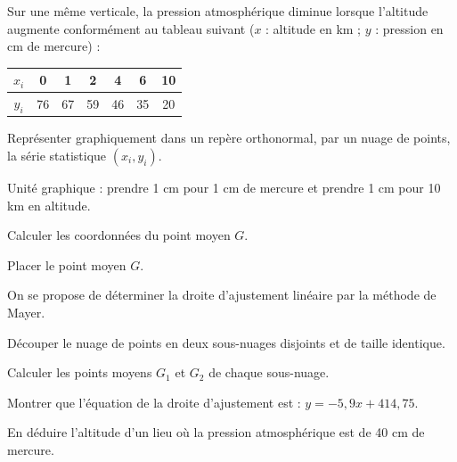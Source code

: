 \documentclass[11pt]{article}
\begin{document}
Sur une même verticale, la pression atmosphérique diminue lorsque l'altitude augmente conformément au tableau suivant ($x$ : altitude en km ; $y$ : pression en cm de mercure) :
\begin{center}\renewcommand{\arraystretch}{1.4}
\begin{tabular}{|c|c|c|c|c|c|c|}
\hline
$x_i$ & 0 & 1 & 2 & 4 & 6 & 10 \\
\hline
$y_i$ & 76 & 67 & 59 & 46 & 35 & 20 \\
\hline
\end{tabular}
\end{center}
\begin{questions}
  \item Représenter graphiquement dans un repère orthonormal, par un nuage de points, la série statistique $(x_i, y_i)$.

  Unité graphique : prendre 1 cm pour 1 cm de mercure et prendre 1 cm pour 10 km en altitude.
  \item Calculer les coordonnées du point moyen $G$.
  \item Placer le point moyen $G$.
  \item On se propose de déterminer la droite d'ajustement linéaire par la méthode de Mayer.
  \begin{sousq}
    \item Découper le nuage de points en deux sous-nuages disjoints et de taille identique.
    \item Calculer les points moyens $G_1$ et $G_2$ de chaque sous-nuage.
    \item Montrer que l'équation de la droite d'ajustement est : $y = -5{,}9x + 414{,}75$.
  \end{sousq}
  \item En déduire l'altitude d'un lieu où la pression atmosphérique est de 40 cm de mercure.
\end{questions}
\end{document}
